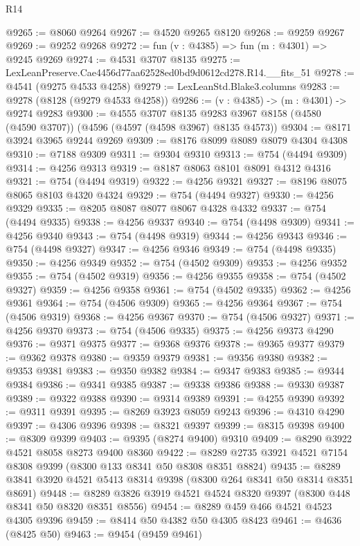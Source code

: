 \begin{lexlean}{R14}
\begin{coremodule}
@9265 := @8060 @9264
@9267 := @4520 @9265 @8120
@9268 := @9259 @9267
@9269 := @9252 @9268
@9272 := fun (v : @4385) => fun (m : @4301) => @9245 @9269
@9274 := @4531 @3707 @8135
@9275 := LexLeanPreserve.Cae4456d77aa62528ed0bd9d0612cd278.R14.__fits_51
@9278 := @4541 (@9275 @4533 @4258)
@9279 := LexLeanStd.Blake3.columns
@9283 := @9278 (@8128 (@9279 @4533 @4258))
@9286 := (v : @4385) -> (m : @4301) -> @9274 @9283
@9300 := @4555
    @3707
    @8135
    @9283
    @3967
    @8158
    (@4580 (@4590 @3707))
    (@4596 (@4597 (@4598 @3967) @8135 @4573))
@9304 := @8171 @3924 @3965 @9244 @9269
@9309 := @8176 @8099 @8089 @8079 @4304 @4308
@9310 := @7188 @9309
@9311 := @9304 @9310
@9313 := @754 (@4494 @9309)
@9314 := @4256 @9313
@9319 := @8187 @8063 @8101 @8091 @4312 @4316
@9321 := @754 (@4494 @9319)
@9322 := @4256 @9321
@9327 := @8196 @8075 @8065 @8103 @4320 @4324
@9329 := @754 (@4494 @9327)
@9330 := @4256 @9329
@9335 := @8205 @8087 @8077 @8067 @4328 @4332
@9337 := @754 (@4494 @9335)
@9338 := @4256 @9337
@9340 := @754 (@4498 @9309)
@9341 := @4256 @9340
@9343 := @754 (@4498 @9319)
@9344 := @4256 @9343
@9346 := @754 (@4498 @9327)
@9347 := @4256 @9346
@9349 := @754 (@4498 @9335)
@9350 := @4256 @9349
@9352 := @754 (@4502 @9309)
@9353 := @4256 @9352
@9355 := @754 (@4502 @9319)
@9356 := @4256 @9355
@9358 := @754 (@4502 @9327)
@9359 := @4256 @9358
@9361 := @754 (@4502 @9335)
@9362 := @4256 @9361
@9364 := @754 (@4506 @9309)
@9365 := @4256 @9364
@9367 := @754 (@4506 @9319)
@9368 := @4256 @9367
@9370 := @754 (@4506 @9327)
@9371 := @4256 @9370
@9373 := @754 (@4506 @9335)
@9375 := @4256 @9373 @4290
@9376 := @9371 @9375
@9377 := @9368 @9376
@9378 := @9365 @9377
@9379 := @9362 @9378
@9380 := @9359 @9379
@9381 := @9356 @9380
@9382 := @9353 @9381
@9383 := @9350 @9382
@9384 := @9347 @9383
@9385 := @9344 @9384
@9386 := @9341 @9385
@9387 := @9338 @9386
@9388 := @9330 @9387
@9389 := @9322 @9388
@9390 := @9314 @9389
@9391 := @4255 @9390
@9392 := @9311 @9391
@9395 := @8269 @3923 @8059 @9243
@9396 := @4310 @4290
@9397 := @4306 @9396
@9398 := @8321 @9397
@9399 := @8315 @9398
@9400 := @8309 @9399
@9403 := @9395 (@8274 @9400) @9310
@9409 := @8290 @3922 @4521 @8058 @8273 @9400 @8360
@9422 := @8289 @2735 @3921 @4521 @7154 @8308 @9399 (@8300 @133 @8341 @50 @8308 @8351 @8824)
@9435 := @8289 @3841 @3920 @4521 @5413 @8314 @9398 (@8300 @264 @8341 @50 @8314 @8351 @8691)
@9448 := @8289 @3826 @3919 @4521 @4524 @8320 @9397 (@8300 @448 @8341 @50 @8320 @8351 @8556)
@9454 := @8289 @459 @466 @4521 @4523 @4305 @9396
@9459 := @8414 @50 @4382 @50 @4305 @8423
@9461 := @4636 (@8425 @50)
@9463 := @9454 (@9459 @9461)

\end{coremodule}
\end{lexlean}
